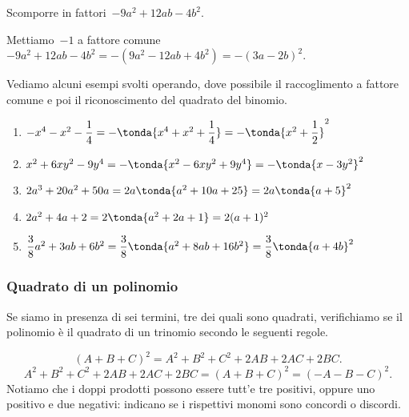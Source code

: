  \begin{esempio}
Scomporre in fattori~\(-9a^{2}+12{ab}-4b^{2}\).

Mettiamo~\(-1\) a fattore comune
\(-9a^{2}+12ab-4b^{2}=-(9a^{2}-12{ab}+4b^{2})=-(3a-2b)^{2}\).
 \end{esempio}

 \begin{esempio}
Vediamo alcuni esempi svolti operando, dove possibile il raccoglimento a 
fattore comune e poi il riconoscimento del quadrato del binomio.

\begin{enumerate}
\item 
\(-x^4-x^2-\dfrac{1}{4}=-\tonda{x^4+x^2+\dfrac{1}{4}}=
  -\tonda{x^2+\dfrac{1}{2}}^{2}\)
\item 
\(x^2+6xy^{2}-9y^{4}=-\tonda{x^2-6xy^{2}+9y^{4}}=
  -\tonda{x-3y^{2}}^{2}\)
\item 
\(2a^{3}+20a^{2}+50a=2a\tonda{a^{2}+10a+25}=2a\tonda{a+5}^{2}\)
\item 
\(2a^{2}+4a+2=2\tonda{a^{2}+2a+1}=2(a+1)^{2}\)
\item 
\(\dfrac{3}{8}a^{2}+3ab+6b^{2}=
  \dfrac{3}{8}\tonda{a^{2}+8ab+16b^{2} }=
  \dfrac{3}{8}\tonda{a+4b}^{2}\)
\end{enumerate}
\end{esempio}


\subsubsection{Quadrato di un polinomio}
\label{subsubsec:divpol_quadpol}

Se siamo in presenza di sei termini, tre dei quali sono quadrati, 
verifichiamo se il polinomio è il quadrato di un trinomio secondo le seguenti 
regole.

\begin{equation*}
(A+B+C)^{2}=A^{2}+B^{2}+C^{2}+2AB+2AC+2BC.
\end{equation*}
\begin{equation*}
A^{2}+B^{2}+C^{2}+2AB+2AC+2BC=(A+B+C)^{2}=(-A-B-C)^{2}.
\end{equation*}
Notiamo che i doppi prodotti possono essere tutt'e tre positivi, oppure uno 
positivo e due negativi: indicano se i rispettivi monomi sono concordi o 
discordi.


